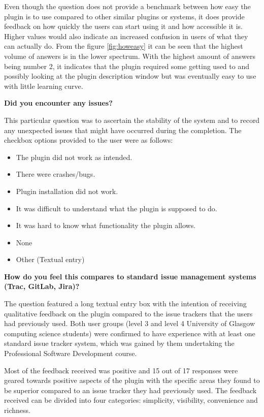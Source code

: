 \documentclass{4thYearProject}
\begin{document}
Even though the question does not provide a benchmark between how easy the plugin is to use compared to other similar plugins or systems, it does provide feedback on how quickly the users can start using it and how accessible it is. Higher values would also indicate an increased confusion in users of what they can actually do. 
From the figure \ref{fig:howeasy} it can be seen that the highest volume of answers is in the lower spectrum. With the highest amount of answers being number 2, it indicates that the plugin required some getting used to and possibly looking at the plugin description window but was eventually easy to use with little learning curve. 

\textbf{Did you encounter any issues?}

This particular question was to ascertain the stability of the system and to record any unexpected issues that might have occurred during the completion. The checkbox options provided to the user were as follows:
\begin{itemize}
\item The plugin did not work as intended.
\item There were crashes/bugs.
\item Plugin installation did not work.
\item It was difficult to understand what the plugin is supposed to do.
\item It was hard to know what functionality the plugin allows.
\item None
\item Other (Textual entry)
\end{itemize}

\textbf{How do you feel this compares to standard issue management systems (Trac, GitLab, Jira)?}

The question featured a long textual entry box with the intention of receiving qualitative feedback on the plugin compared to the issue trackers that the users had previously used. Both user groups (level 3 and level 4 University of Glasgow computing science students) were confirmed to have experience with at least one standard issue tracker system, which was gained by them undertaking the Professional Software Development course.

Most of the feedback received was positive and 15 out of 17 responses were geared towards positive aspects of the plugin with the specific areas they found to be superior compared to an issue tracker they had previously used. The feedback received can be divided into four categories: simplicity, visibility, convenience and richness.
\end{document}
